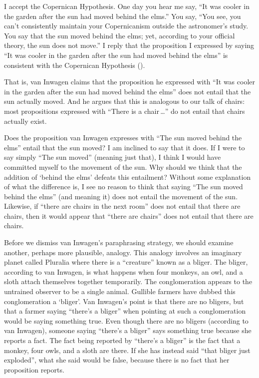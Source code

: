 \documentclass[11pt]{article}
\newenvironment{squote}{%
\begin{spacing}{1}
\begin{list}{}{%
    \setlength{\labelwidth}{0pt}%
    \rightmargin\leftmargin%
  }
\item\relax
}{%
\end{list}%
\end{spacing}
}
\begin{document}
\begin{spacing}{1.5}
\begin{squote}
I accept the Copernican Hypothesis.  One day you hear me say, ``It was
cooler in the garden after the sun had moved behind the elms.''  You
say, ``You see, you can't consistently maintain your Copernicanism
outside the astronomer's study.  You say that the sun moved behind the
elms; yet, according to your official theory, the sun does not move.''
I reply that the proposition I expressed by saying ``It was cooler in
the garden after the sun had moved behind the elms'' is consistent
with the Copernican Hypothesis (\citeyear[101]{inwagen1995}).
\end{squote}
That is, van Inwagen claims that the proposition he expressed with
``It was cooler in the garden after the sun had moved behind the
elms'' does not entail that the sun actually moved.  And he argues
that this is analogous to our talk of chairs: most propositions
expressed with ``There is a chair\,\ldots '' do not entail that chairs
actually exist.

Does the proposition van Inwagen expresses with ``The sun moved behind
the elms'' entail that the sun moved? I am inclined to say that it
does.  If I were to say simply ``The sun moved'' (meaning just that),
I think I would have committed myself to the movement of the sun.  Why
should we think that the addition of `behind the elms' defeats this
entailment?  Without some explanation of what the difference is, I see
no reason to think that saying ``The sun moved behind the elms'' (and
meaning it) does not entail the movement of the sun.  Likewise, if
``there are chairs in the next room'' does not entail that there are
chairs, then it would appear that ``there are chairs'' does not entail
that there are chairs.

Before we dismiss van Inwagen's paraphrasing strategy, we should
examine another, perhaps more plausible, analogy.  This analogy
involves an imaginary planet called Pluralia where there is a
``creature'' known as a bliger.  The bliger, according to van Inwagen,
is what happens when four monkeys, an owl, and a sloth attach
themselves together temporarily.  The conglomeration appears to the
untrained observer to be a single animal.  Gullible farmers have
dubbed this conglomeration a `bliger'.  Van Inwagen's point is that
there are no bligers, but that a farmer saying ``there's a bliger''
when pointing at such a conglomeration would be saying something true.
Even though there are no bligers (according to van Inwagen), someone
saying ``there's a bliger'' says something true because she reports a
fact.  The fact being reported by ``there's a bliger'' is the fact
that a monkey, four owls, and a sloth are there.  If she has instead
said ``that bliger just exploded'', what she said would be false,
because there is no fact that her proposition reports.


\end{spacing}
\end{document}
